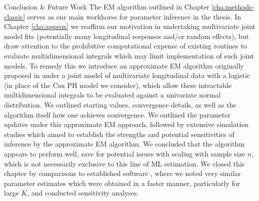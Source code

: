 \begin{chapter}{\label{cha:conclusion}Conclusion \& Future Work}
The EM algorithm outlined in Chapter \ref{cha:methods-classic} serves as our main workhorse for parameter inference in the thesis. In Chapter \ref{cha:approx} we reaffirm our motivation in undertaking multivariate joint model fits (\ie potentially many longitudinal responses and/or random effects), but draw attention to the prohibitive computational expense of existing routines to evaluate multidimensional integrals which may limit implementation of such joint models.\newline
To remedy this we introduce an approximate EM algorithm originally proposed in \citet{Bernhardt15} under a joint model of multivariate longitudinal data with a logistic (in place of the Cox PH model we consider), which allow these intractable multidimensional integrals to be evaluated against a univariate normal distribution.\newline
We outlined starting values, convergence details, as well as the algorithm itself \ie how one achieves convergence. We outlined the parameter updates under this approximate EM approach, followed by extensive simulation studies which aimed to establish the strengths and potential sensitivities of inference by the approximate EM algorithm. We concluded that the algorithm appears to perform well, save for potential issues with scaling with sample size $n$, which is not necessarily exclusive to this line of ML estimation. We closed this chapter by comparisons to established software \citep{Hickey2018}, where we noted very similar parameter estimates which were obtained in a faster manner, particularly for large $K$, and conducted sensitivity analyses.


\end{chapter}
